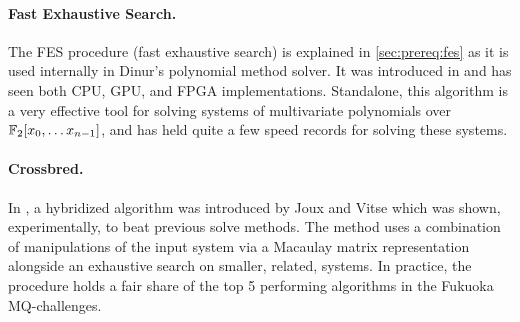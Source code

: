 \paragraph{Fast Exhaustive Search.} The FES procedure (fast exhaustive search) is explained in \cref{sec:prereq:fes} as it is used internally in Dinur's polynomial method solver. It was introduced in \cite{ches-2010-23990} and has seen both CPU, GPU, and FPGA implementations. Standalone, this algorithm is a very effective tool for solving systems of multivariate polynomials over $\mathbb{F}_2[x_0,\dots x_{n - 1}]$, and has held quite a few speed records for solving these systems.

\paragraph{Crossbred.} In \cite{cryptoeprint:2017/372}, a hybridized algorithm was introduced by Joux and Vitse which was shown, experimentally, to beat previous solve methods. The method uses a combination of manipulations of the input system via a Macaulay matrix representation alongside an exhaustive search on smaller, related, systems. In practice, the procedure holds a fair share of the top 5 performing algorithms in the Fukuoka MQ-challenges.


\newpage
